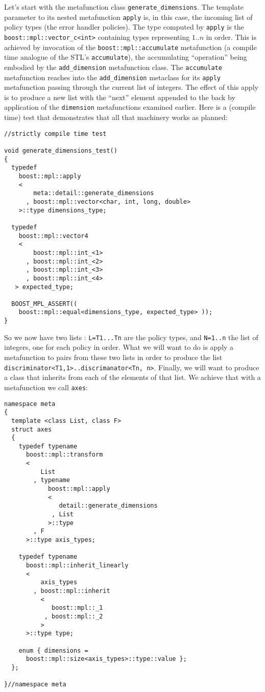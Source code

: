 \documentclass[a4paper,twoside,twocolumn]{article}
\begin{document}
Let's start with the metafunction class
\verb|generate_dimensions|. The template parameter to its nested
metafunction \verb|apply| is, in this case, the incoming list of policy
types (the error handler policies). The type computed by \verb|apply|
is the \verb|boost::mpl::vector_c<int>| containing types representing
$1..n$ in order. This is achieved by invocation of the
\verb|boost::mpl::accumulate| metafunction (a compile time analogue of
the STL's \verb|accumulate|), the accumulating ``operation'' being
embodied by the \verb|add_dimension| metafunction class. The
\verb|accumulate| metafunction reaches into the \verb|add_dimension|
metaclass for its \verb|apply| metafunction passing through the current
list of integers. The effect of this apply is to produce a new list
with the ``next'' element appended to the back by application of the
\verb|dimension| metafunctions examined earlier.
Here is a (compile time) test that demonstrates that all that
machinery works as planned:
\begin{verbatim}
//strictly compile time test

void generate_dimensions_test()
{
  typedef
    boost::mpl::apply
    <
        meta::detail::generate_dimensions
      , boost::mpl::vector<char, int, long, double>
    >::type dimensions_type;

  typedef
    boost::mpl::vector4
    <
        boost::mpl::int_<1>
      , boost::mpl::int_<2>
      , boost::mpl::int_<3>
      , boost::mpl::int_<4>
   > expected_type;

  BOOST_MPL_ASSERT(( 
    boost::mpl::equal<dimensions_type, expected_type> ));
}
\end{verbatim}
So we now have two lists : \verb|L=T1...Tn| are the policy types, and
\verb|N=1..n| the list of integers, one for each policy in order. What
we will want to do is apply a metafunction to pairs from these two
lists in order to produce the list 
\verb|discriminator<T1,1>..discrimanator<Tn, n>|. Finally, we will
want to produce a class that inherits from each of the elements of
that list. We achieve that with a metafunction we call \verb|axes|:
\begin{verbatim}
namespace meta
{
  template <class List, class F>
  struct axes
  {
    typedef typename
      boost::mpl::transform
      <
          List
        , typename
            boost::mpl::apply
            <
               detail::generate_dimensions
             , List
            >::type
        , F
      >::type axis_types;
  
    typedef typename
      boost::mpl::inherit_linearly
      <
          axis_types
        , boost::mpl::inherit
          <
             boost::mpl::_1
           , boost::mpl::_2
          >
      >::type type;
  
    enum { dimensions = 
      boost::mpl::size<axis_types>::type::value };
  };
  
}//namespace meta
\end{verbatim}
\end{document}
